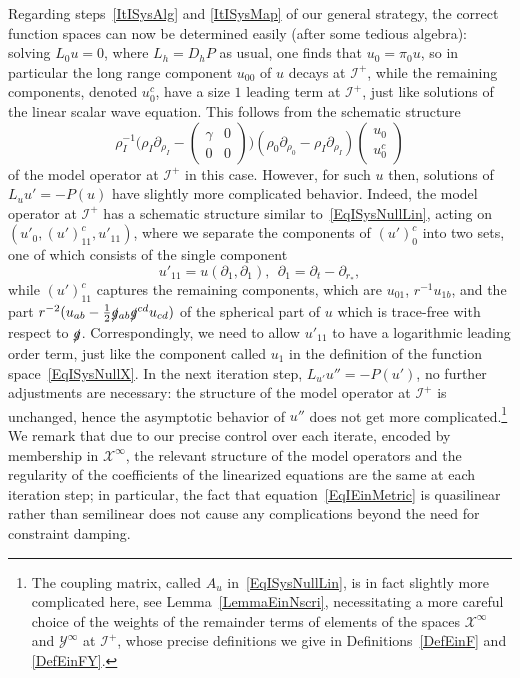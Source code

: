 \documentclass[reqno,11pt,letterpaper]{amsart}
\numberwithin{equation}{section}
\numberwithin{figure}{section}
\theoremstyle{definition}
\theoremstyle{remark}
\newcommand{\mc}{\mathcal}
\newcommand{\cX}{\mc X}
\newcommand{\cY}{\mc Y}
\newcommand{\ms}{\mathscr}
\newcommand{\scri}{\ms I}
\newcommand{\slg}{\slashed{g}{}}
\newcommand{\pa}{\partial}
\newcommand{\half}{\tfrac{1}{2}}
\begin{document}
Regarding steps~\ref{ItISysAlg} and \ref{ItISysMap} of our general strategy, the correct function spaces can now be determined easily (after some tedious algebra): solving $L_0 u=0$, where $L_h=D_h P$ as usual, one finds that $u_0=\pi_0 u$, so in particular the long range component $u_{0 0}$ of $u$ decays at $\scri^+$, while the remaining components, denoted $u_0^c$, have a size $1$ leading term at $\scri^+$, just like solutions of the linear scalar wave equation. This follows from the schematic structure
\[
  \rho_I^{-1}\biggl(\rho_I\pa_{\rho_I}-\begin{pmatrix} \gamma & 0 \\ 0 & 0 \end{pmatrix}\biggr)(\rho_0\pa_{\rho_0}-\rho_I\pa_{\rho_I}) \begin{pmatrix} u_0 \\ u_0^c \end{pmatrix}
\]
of the model operator at $\scri^+$ in this case. However, for such $u$ then, solutions of $L_u u'=-P(u)$ have slightly more complicated behavior. Indeed, the model operator at $\scri^+$ has a schematic structure similar to~\eqref{EqISysNullLin}, acting on $(u'_0,(u')_{1 1}^c,u'_{1 1})$, where we separate the components of $(u')_0^c$ into two sets, one of which consists of the single component
\begin{equation}
\label{EqIEinBad}
  u'_{1 1}=u(\pa_1,\pa_1),\ \ \pa_1=\pa_t-\pa_{r_*},
\end{equation}
while $(u')_{1 1}^c$ captures the remaining components, which are $u_{0 1}$, $r^{-1} u_{1 b}$, and the part $r^{-2}(u_{a b}-\half\slg_{a b}\slg^{c d}u_{c d})$ of the spherical part of $u$ which is trace-free with respect to $\slg$. Correspondingly, we need to allow $u'_{1 1}$ to have a logarithmic leading order term, just like the component called $u_1$ in the definition of the function space~\eqref{EqISysNullX}. In the next iteration step, $L_{u'}u''=-P(u')$, no further adjustments are necessary: the structure of the model operator at $\scri^+$ is unchanged, hence the asymptotic behavior of $u''$ does not get more complicated.\footnote{The coupling matrix, called $A_u$ in~\eqref{EqISysNullLin}, is in fact slightly more complicated here, see Lemma~\ref{LemmaEinNscri}, necessitating a more careful choice of the weights of the remainder terms of elements of the spaces $\cX^\infty$ and $\cY^\infty$ at $\scri^+$, whose precise definitions we give in Definitions~\ref{DefEinF} and \ref{DefEinFY}.} We remark that due to our precise control over each iterate, encoded by membership in $\cX^\infty$, the relevant structure of the model operators and the regularity of the coefficients of the linearized equations are the same at each iteration step; in particular, the fact that equation~\eqref{EqIEinMetric} is quasilinear rather than semilinear does not cause any complications beyond the need for constraint damping.
\end{document}
